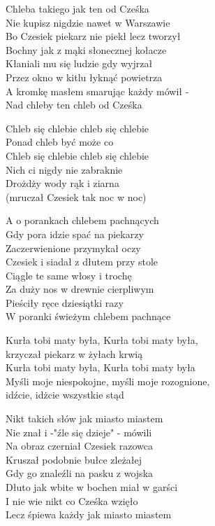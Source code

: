 
\begin{text}
    Chleba takiego jak ten od Cześka\\
    Nie kupisz nigdzie nawet w Warszawie\\
    Bo Czesiek piekarz nie piekł lecz tworzył\\
    Bochny jak z mąki słonecznej kołacze\\
    Kłaniali mu się ludzie gdy wyjrzał\\
    Przez okno w kitlu łyknąć powietrza\\
    A kromkę masłem smarując każdy mówił -\\
    Nad chleby ten chleb od Cześka

    \vin Chleb się chlebie chleb się chlebie\\
    \vin Ponad chleb być może co\\
    \vin Chleb się chlebie chleb się chlebie\\
    \vin Nich ci nigdy nie zabraknie\\
    \vin Drożdży wody rąk i ziarna\\
    \vin (mruczał Czesiek tak noc w noc)

    A o porankach chlebem pachnących\\
    Gdy pora idzie spać na piekarzy\\
    Zaczerwienione przymykał oczy\\
    Czesiek i siadał z dłutem przy stole\\
    Ciągle te same włosy i trochę\\
    Za duży nos w drewnie cierpliwym\\
    Pieściły ręce dziesiątki razy\\
    W poranki świeżym chlebem pachnące

    Kurła tobi maty była, Kurła tobi maty była,\\
    krzyczał piekarz w żyłach krwią\\
    Kurła tobi maty była, Kurła tobi maty była\\
    Myśli moje niespokojne, myśli moje rozognione,\\
    idźcie, idżcie wszystkie stąd

    Nikt takich słów jak miasto miastem\\
    Nie znał i -"źle się dzieje" - mówili\\
    Na obraz czerniał Czesiek razowca\\
    Kruszał podobnie bułce zleżałej\\
    Gdy go znaleźli na pasku z wojska\\
    Dłuto jak wbite w bochen miał w garści\\
    I nie wie nikt co Cześka wzięło\\
    Lecz śpiewa każdy jak miasto miastem
\end{text}
\begin{chord}

\end{chord}